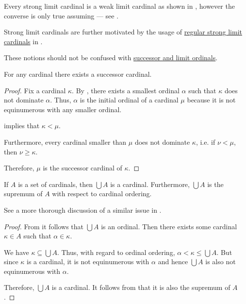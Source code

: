 \begin{definition}
\begin{thmenum}
    Every strong limit cardinal is a weak limit cardinal as shown in , however the converse is only true assuming  --- see .

    Strong limit cardinals are further motivated by the usage of \hyperref[rem:strongly_inaccessible_cardinal]{regular strong limit cardinals} in .
  \end{thmenum}

  These notions should not be confused with \hyperref[def:successor_and_limit_ordinal]{successor and limit ordinals}.
\end{definition}

\begin{proposition}\label{thm:successor_cardinal_existence}
  For any cardinal there exists a successor cardinal.
\end{proposition}
\begin{proof}
  Fix a cardinal \( \kappa \). By , there exists a smallest ordinal \( \alpha \) such that \( \kappa \) does not dominate \( \alpha \). Thus, \( \alpha \) is the initial ordinal of a cardinal \( \mu \) because it is not equinumerous with any smaller ordinal.

   implies that \( \kappa < \mu \).

  Furthermore, every cardinal smaller than \( \mu \) does not dominate \( \kappa \), i.e. if \( \nu < \mu \), then \( \nu \geq \kappa \).

  Therefore, \( \mu \) is the successor cardinal of \( \kappa \).
\end{proof}

\begin{proposition}\label{thm:union_of_set_of_cardinals}
  If \( A \) is a set of cardinals, then \( \bigcup A \) is a cardinal. Furthermore, \( \bigcup A \) is the supremum of \( A \) with respect to cardinal ordering.

  See a more thorough discussion of a similar issue in .
\end{proposition}
\begin{proof}
  From  it follows that \( \bigcup A \) is an ordinal. Then there exists some cardinal \( \kappa \in A \) such that \( \alpha \in \kappa \).

  We have \( \kappa \subseteq \bigcup A \). Thus, with regard to ordinal ordering, \( \alpha < \kappa \leq \bigcup A \). But since \( \kappa \) is a cardinal, it is not equinumerous with \( \alpha \) and hence \( \bigcup A \) is also not equinumerous with \( \alpha \).

  Therefore, \( \bigcup A \) is a cardinal. It follows from  that it is also the supremum of \( A \).
\end{proof}

